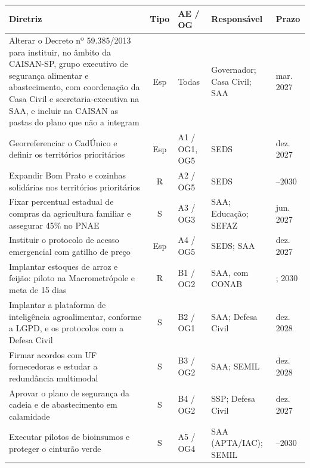 \documentclass[
	12pt,				%
	openright,			%
	oneside,			%
	a4paper,			%
	chapter=TITLE,		%
	section=TITLE,		%
	english,			%
	french,				%
	spanish,			%
	brazil,				%
 ]{abntex2}
\begin{document}
\begin{quadro}[!htbp]
\centering
\caption{Diretrizes estratégicas da opção Resiliência Inclusiva}
\label{qua:diretrizes-fase-estrategica}
\footnotesize
\renewcommand{\arraystretch}{1.05}
\setlength{\tabcolsep}{3pt}
\begin{tabularx}{\textwidth}{|>{\raggedright\arraybackslash}X|c|>{\centering\arraybackslash}p{1.5cm}|>{\raggedright\arraybackslash}p{2.6cm}|>{\raggedright\arraybackslash}p{1.6cm}|}
\hline
\textbf{Diretriz} & \textbf{Tipo} & \textbf{AE / OG} & \textbf{Responsável} & \textbf{Prazo} \\
\hline
Alterar o Decreto nº 59.385/2013 para instituir, no âmbito da CAISAN-SP, grupo executivo de segurança alimentar e abastecimento, com coordenação da Casa Civil e secretaria-executiva na SAA, e incluir na CAISAN as pastas do plano que não a integram & Esp & Todas & Governador; Casa Civil; SAA & mar. 2027 \\
\hline
Georreferenciar o CadÚnico e definir os territórios prioritários & Esp & A1 / OG1, OG5 & SEDS & dez. 2027 \\
\hline
Expandir Bom Prato e cozinhas solidárias nos territórios prioritários & R & A2 / OG5 & SEDS & 2028--2030 \\
\hline
Fixar percentual estadual de compras da agricultura familiar e assegurar 45\% no PNAE & S & A3 / OG3 & SAA; Educação; SEFAZ & jun. 2027 \\
\hline
Instituir o protocolo de acesso emergencial com gatilho de preço & Esp & A4 / OG5 & SEDS; SAA & dez. 2027 \\
\hline
Implantar estoques de arroz e feijão: piloto na Macrometrópole e meta de 15 dias & R & B1 / OG2 & SAA, com CONAB & 2028; 2030 \\
\hline
Implantar a plataforma de inteligência agroalimentar, conforme a LGPD, e os protocolos com a Defesa Civil & S & B2 / OG1 & SAA; Defesa Civil & dez. 2028 \\
\hline
Firmar acordos com UF fornecedoras e estudar a redundância multimodal & S & B3 / OG2 & SAA; SEMIL & dez. 2028 \\
\hline
Aprovar o plano de segurança da cadeia e de abastecimento em calamidade & S & B4 / OG2 & SSP; Defesa Civil & dez. 2027 \\
\hline
Executar pilotos de bioinsumos e proteger o cinturão verde & S & A5 / OG4 & SAA (APTA/IAC); SEMIL & 2027--2030 \\
\hline
\end{tabularx}
\end{quadro}
\end{document}
